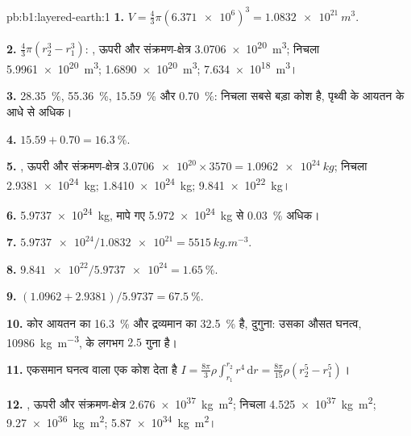 \begin{solution}{pb:b1:layered-earth:1}
\textbf{1.} $V = \tfrac43\pi(\num{6.371e6})^3 = \qty{1.0832e21}{m^3}$.

\textbf{2.} $\tfrac43\pi(r_2^3 - r_1^3)$: , ऊपरी  और संक्रमण-क्षेत्र
\qty{3.0706e20}{m^3}; निचला  \qty{5.9961e20}{m^3}; 
\qty{1.6890e20}{m^3};  \qty{7.634e18}{m^3}।

\textbf{3.} \qty{28.35}{\percent}, \qty{55.36}{\percent}, \qty{15.59}{\percent}
और \qty{0.70}{\percent}: निचला  सबसे बड़ा कोश है, पृथ्वी के आयतन के आधे से अधिक।

\textbf{4.} $15.59 + 0.70 = \qty{16.3}{\percent}$.

\textbf{5.} , ऊपरी  और संक्रमण-क्षेत्र $\num{3.0706e20}\times3570 =
\qty{1.0962e24}{kg}$; निचला  \qty{2.9381e24}{kg}; 
\qty{1.8410e24}{kg};  \qty{9.841e22}{kg}।

\textbf{6.} \qty{5.9737e24}{kg}, मापे गए \qty{5.972e24}{kg} से \qty{0.03}{\percent} अधिक।

\textbf{7.} $\num{5.9737e24}/\num{1.0832e21} = \qty{5515}{kg.m^{-3}}$.

\textbf{8.} $\num{9.841e22}/\num{5.9737e24} = \qty{1.65}{\percent}$.

\textbf{9.} $(1.0962 + 2.9381)/5.9737 = \qty{67.5}{\percent}$.

\textbf{10.} कोर आयतन का \qty{16.3}{\percent} और द्रव्यमान का \qty{32.5}{\percent} है, दुगुना: उसका औसत घनत्व,
\qty{10986}{kg.m^{-3}},  के लगभग $2.5$ गुना है।

\textbf{11.} एकसमान घनत्व वाला एक कोश देता है
$I = \tfrac{8\pi}{3}\rho\int_{r_1}^{r_2} r^4\,\mathrm dr = \tfrac{8\pi}{15}\rho
(r_2^5 - r_1^5)$।

\textbf{12.} , ऊपरी  और संक्रमण-क्षेत्र \qty{2.676e37}{kg.m^2}; निचला 
\qty{4.525e37}{kg.m^2};  \qty{9.27e36}{kg.m^2}; 
\qty{5.87e34}{kg.m^2}।


\end{solution}
